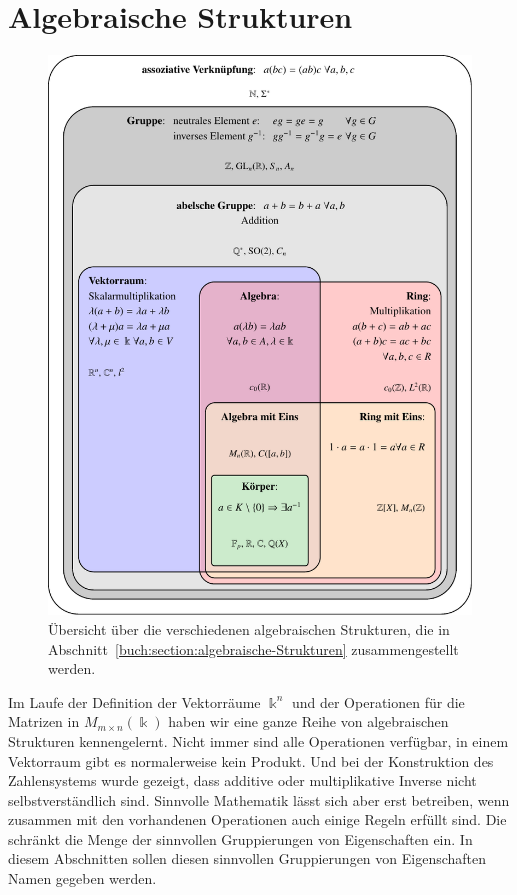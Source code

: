 %
%
%
\section{Algebraische Strukturen
\label{buch:section:algebraische-Strukturen}}
\begin{figure}
\centering
\includegraphics[width=\textwidth]{chapters/10-vektorenmatrizen/images/strukturen.pdf}
\caption{Übersicht über die verschiedenen algebraischen Strukturen, die
in Abschnitt~\ref{buch:section:algebraische-Strukturen} zusammengestellt
werden.
\label{buch:vektorenmatrizen:fig:strukturen}}
\end{figure}
Im Laufe der Definition der Vektorräume $\Bbbk^n$ und der
Operationen für die Matrizen in $M_{m\times n}(\Bbbk)$ haben
wir eine ganze Reihe von algebraischen Strukturen kennengelernt.
Nicht immer sind alle Operationen verfügbar, in einem Vektorraum
gibt es normalerweise kein Produkt.
Und bei der Konstruktion des Zahlensystems wurde gezeigt, dass
additive oder multiplikative Inverse nicht selbstverständlich
sind.
Sinnvolle Mathematik lässt sich aber erst betreiben, wenn zusammen
mit den vorhandenen Operationen auch einige Regeln erfüllt sind.
Die schränkt die Menge der sinnvollen Gruppierungen von Eigenschaften
ein.
In diesem Abschnitten sollen diesen sinnvollen Gruppierungen von
Eigenschaften Namen gegeben werden.








